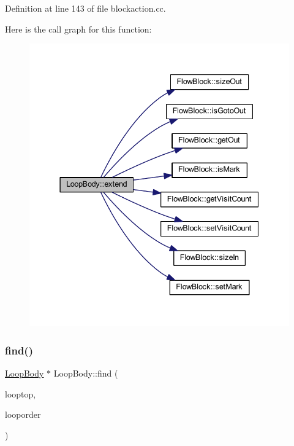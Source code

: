 Definition at line 143 of file blockaction.\+cc.

Here is the call graph for this function\+:
\nopagebreak
\begin{figure}[H]
\begin{center}
\leavevmode
\includegraphics[width=337pt]{class_loop_body_add1dd57bc541e2a76e7874017721fd48_cgraph}
\end{center}
\end{figure}
\mbox{\label{class_loop_body_a4fd224d75508dcfb4826877b99ad32ce}} 
\subsubsection{\texorpdfstring{find()}{find()}}
{\footnotesize\ttfamily \mbox{\hyperlink{class_loop_body}{Loop\+Body}} $\ast$ Loop\+Body\+::find (\begin{DoxyParamCaption}\item[{\mbox{\hyperlink{class_flow_block}{Flow\+Block}} $\ast$}]{looptop,  }\item[{const vector$<$ \mbox{\hyperlink{class_loop_body}{Loop\+Body}} $\ast$ $>$ \&}]{looporder }\end{DoxyParamCaption})\hspace{0.3cm}{\ttfamily [static]}}



